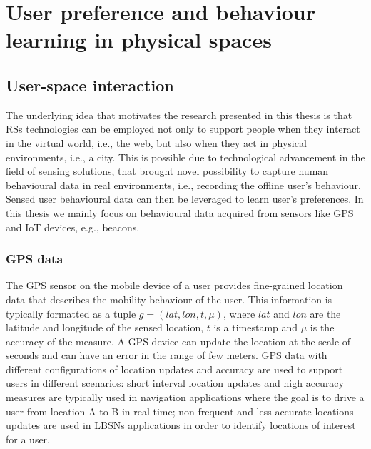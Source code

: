 \chapter{User preference and behaviour learning in physical spaces}
\label{cha:behaviour_learning}
\ifpdf
    \graphicspath{{Chapter4/Figs/Raster/}{Chapter4/Figs/PDF/}{Chapter4/Figs/}}
\else
    \graphicspath{{Chapter4/Figs/Vector/}{Chapter4/Figs/}}
\fi

\section{User-space interaction}
The underlying idea that motivates the research presented in this thesis is that RSs technologies can be employed not only to support people when they interact in the virtual world, i.e., the web, but also when they act in physical environments, i.e., a city.
This is possible due to technological advancement in the field of sensing solutions, that brought novel possibility to capture human behavioural data in real environments, i.e., recording the offline user's behaviour. Sensed user behavioural data can then be leveraged to learn user's preferences. In this thesis we mainly focus on behavioural data acquired from sensors like GPS and IoT devices, e.g., beacons.

\subsection{GPS data}
The GPS sensor on the mobile device of a user provides fine-grained location data that describes the mobility behaviour of the user. This information is typically formatted as a tuple $g=(lat,lon,t,\mu)$, where $lat$ and $lon$ are the latitude and longitude of the sensed location, $t$ is a timestamp and $\mu$ is the accuracy of the measure. A GPS device can update the location at the scale of seconds and can have an error in the range of few meters. 
GPS data with different configurations of location updates and accuracy are used to support users in different scenarios: short interval location updates and high accuracy measures are typically used in navigation applications where the goal is to drive a user from location A to B in real time; non-frequent and less accurate locations updates are used in LBSNs applications in order to identify locations of interest for a user.


